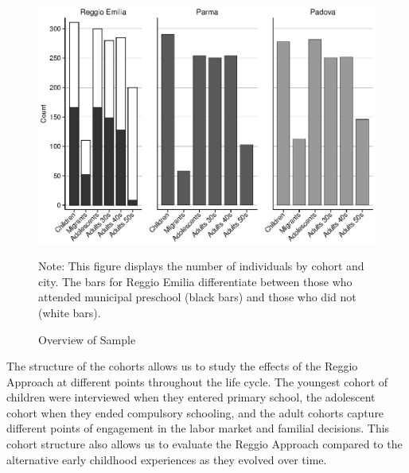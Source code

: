 \begin{figure}[H]
\begin{center}
\caption{Overview of Sample}\label{fig:sample}
	\includegraphics[width=.9\textwidth]{output/sample.eps}
\end{center}
\raggedright
Note: This figure displays the number of individuals by cohort and city. The bars for Reggio Emilia differentiate between those who attended municipal preschool (black bars) and those who did not (white bars). 
\end{figure}

\begin{table}[H]
\centering
{}
\end{table}

The structure of the cohorts allows us to study the effects of the Reggio Approach at different points throughout the life cycle. The youngest cohort of children were interviewed when they entered primary school, the adolescent cohort when they ended compulsory schooling, and the adult cohorts capture different points of engagement in the labor market and familial decisions. This cohort structure also allows us to evaluate the Reggio Approach compared to the alternative early childhood experiences as they evolved over time.

